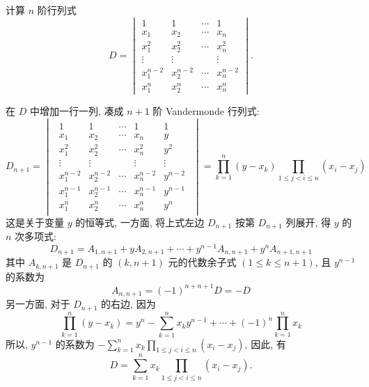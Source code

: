 \begin{example}[2006 山东大学]
    计算 $n$ 阶行列式\label{fmty}
    $$D=\begin{vmatrix}
            1         & 1         & \cdots & 1         \\
            x_1       & x_2       & \cdots & x_n       \\
            x_1^2     & x_2^2     & \cdots & x_n^2     \\
            \vdots    & \vdots    &        & \vdots    \\
            x_1^{n-2} & x_2^{n-2} & \cdots & x_n^{n-2} \\
            x_1^n     & x_2^n     & \cdots & x_n^n
        \end{vmatrix}.$$
\end{example}
\begin{solution}
    在 $D$ 中增加一行一列, 凑成 $n+1$ 阶 Vandermonde 行列式:
    $$D_{n+1}=\begin{vmatrix}
            \begin{array}{cccc|c|}
                1         & 1         & \cdots & 1         & 1       \\
                x_1       & x_2       & \cdots & x_n       & y       \\
                x_1^2     & x_2^2     & \cdots & x_n^2     & y^2     \\
                \vdots    & \vdots    &        & \vdots    & \vdots  \\
                x_1^{n-2} & x_2^{n-2} & \cdots & x_n^{n-2} & y^{n-2} \\ \hline
                x_1^{n-1} & x_2^{n-1} & \cdots & x_n^{n-1} & y^{n-1} \\ \hline
                x_1^n     & x_2^n     & \cdots & x_n^n     & y^n
            \end{array}
        \end{vmatrix}=\prod_{k=1}^{n}(y-x_k)\prod_{1\leqslant j<i\leqslant n}(x_i-x_j)$$
        这是关于变量 $y$ 的恒等式, 一方面, 将上式左边 $D_{n+1}$ 按第 $D_{n+1}$ 列展开, 得 $y$ 的 $n$ 次多项式:
        $$D_{n+1}=A_{1,n+1}+yA_{2,n+1}+\cdots+y^{n-1}A_{n,n+1}+y^nA_{n+1,n+1}$$
        其中 $A_{k,n+1}$ 是 $D_{n+1}$ 的 $(k,n+1)$ 元的代数余子式 $(1\leqslant k\leqslant n+1)$, 且 $y^{n-1}$ 的系数为
        $$A_{n,n+1}=(-1)^{n+n+1}D=-D$$
        另一方面, 对于 $D_{n+1}$ 的右边, 因为 $$\prod_{k=1}^{n}(y-x_k)=y^n-\sum_{k=1}^{n}x_ky^{n-1}+\cdots+(-1)^n\prod_{k=1}^{n}x_k$$
        所以, $y^{n-1}$ 的系数为 $\displaystyle-\sum_{k=1}^{n}x_k\prod_{1\leqslant j<i\leqslant n}(x_i-x_j)$, 因此, 有
        $$D=\sum_{k=1}^{n}x_k\prod_{1\leqslant j<i\leqslant n}(x_i-x_j).$$
\end{solution}